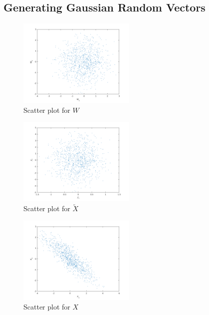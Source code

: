 \documentclass{article}
\begin{document}
	\subsection{Generating Gaussian Random Vectors}
	\begin{figure}[h]
		\begin{center}
		\includegraphics[width=0.5\textwidth]{rvW.png}
		\caption{Scatter plot for $W$}
		\end{center}
	\end{figure}
	\begin{figure}[h]
		\begin{center}
		\includegraphics[width=0.5\textwidth]{rvXtilda.png}
		\caption{Scatter plot for $\tilde{X}$}
		\end{center}
	\end{figure}
	\begin{figure}[h]
		\begin{center}
		\includegraphics[width=0.5\textwidth]{rvX.png}
		\caption{Scatter plot for $X$}
		\end{center}
	\end{figure}
\end{document}
